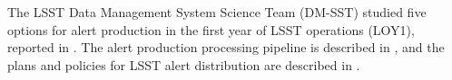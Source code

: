 

 The \gls{LSST} \gls{Data Management System} Science Team (\gls{DM}-SST) studied five options for alert production in the first year of \gls{LSST} operations (LOY1), reported in  . The alert production processing \gls{pipeline} is described in  , and the plans and policies for \gls{LSST} alert distribution  are described in . 
